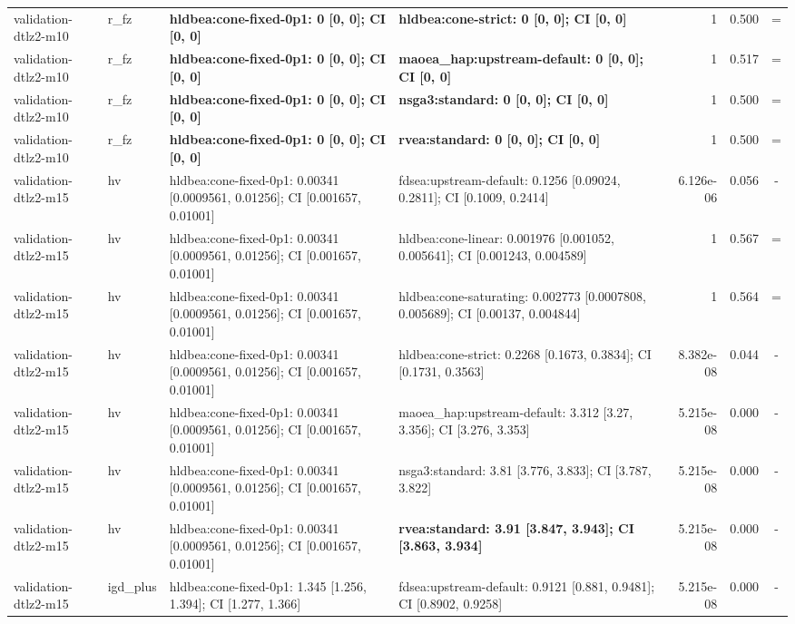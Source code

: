 \begin{tabular}{llllrrc}
validation-dtlz2-m10 & r\_fz & \textbf{hldbea:cone-fixed-0p1: 0 [0, 0]; CI [0, 0]} & \textbf{hldbea:cone-strict: 0 [0, 0]; CI [0, 0]} & 1 & 0.500 & = \\
validation-dtlz2-m10 & r\_fz & \textbf{hldbea:cone-fixed-0p1: 0 [0, 0]; CI [0, 0]} & \textbf{maoea\_hap:upstream-default: 0 [0, 0]; CI [0, 0]} & 1 & 0.517 & = \\
validation-dtlz2-m10 & r\_fz & \textbf{hldbea:cone-fixed-0p1: 0 [0, 0]; CI [0, 0]} & \textbf{nsga3:standard: 0 [0, 0]; CI [0, 0]} & 1 & 0.500 & = \\
validation-dtlz2-m10 & r\_fz & \textbf{hldbea:cone-fixed-0p1: 0 [0, 0]; CI [0, 0]} & \textbf{rvea:standard: 0 [0, 0]; CI [0, 0]} & 1 & 0.500 & = \\
validation-dtlz2-m15 & hv & hldbea:cone-fixed-0p1: 0.00341 [0.0009561, 0.01256]; CI [0.001657, 0.01001] & fdsea:upstream-default: 0.1256 [0.09024, 0.2811]; CI [0.1009, 0.2414] & 6.126e-06 & 0.056 & - \\
validation-dtlz2-m15 & hv & hldbea:cone-fixed-0p1: 0.00341 [0.0009561, 0.01256]; CI [0.001657, 0.01001] & hldbea:cone-linear: 0.001976 [0.001052, 0.005641]; CI [0.001243, 0.004589] & 1 & 0.567 & = \\
validation-dtlz2-m15 & hv & hldbea:cone-fixed-0p1: 0.00341 [0.0009561, 0.01256]; CI [0.001657, 0.01001] & hldbea:cone-saturating: 0.002773 [0.0007808, 0.005689]; CI [0.00137, 0.004844] & 1 & 0.564 & = \\
validation-dtlz2-m15 & hv & hldbea:cone-fixed-0p1: 0.00341 [0.0009561, 0.01256]; CI [0.001657, 0.01001] & hldbea:cone-strict: 0.2268 [0.1673, 0.3834]; CI [0.1731, 0.3563] & 8.382e-08 & 0.044 & - \\
validation-dtlz2-m15 & hv & hldbea:cone-fixed-0p1: 0.00341 [0.0009561, 0.01256]; CI [0.001657, 0.01001] & maoea\_hap:upstream-default: 3.312 [3.27, 3.356]; CI [3.276, 3.353] & 5.215e-08 & 0.000 & - \\
validation-dtlz2-m15 & hv & hldbea:cone-fixed-0p1: 0.00341 [0.0009561, 0.01256]; CI [0.001657, 0.01001] & nsga3:standard: 3.81 [3.776, 3.833]; CI [3.787, 3.822] & 5.215e-08 & 0.000 & - \\
validation-dtlz2-m15 & hv & hldbea:cone-fixed-0p1: 0.00341 [0.0009561, 0.01256]; CI [0.001657, 0.01001] & \textbf{rvea:standard: 3.91 [3.847, 3.943]; CI [3.863, 3.934]} & 5.215e-08 & 0.000 & - \\
validation-dtlz2-m15 & igd\_plus & hldbea:cone-fixed-0p1: 1.345 [1.256, 1.394]; CI [1.277, 1.366] & fdsea:upstream-default: 0.9121 [0.881, 0.9481]; CI [0.8902, 0.9258] & 5.215e-08 & 0.000 & - \\

\end{tabular}

